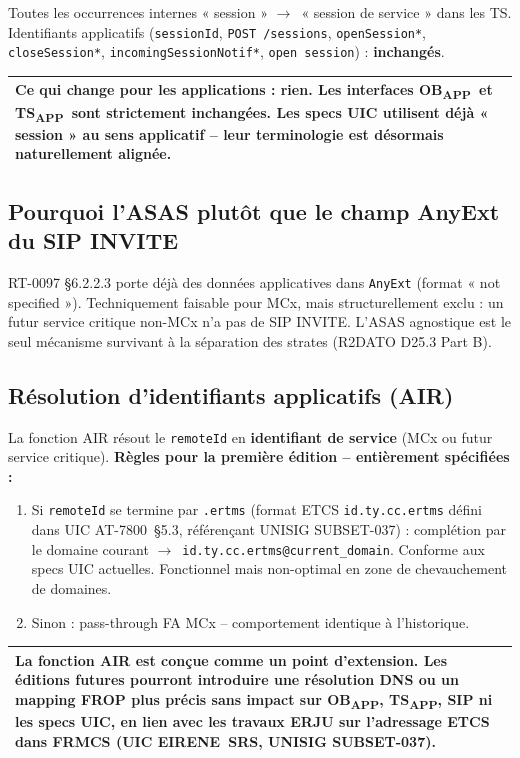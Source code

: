 \documentclass[11pt,a4paper]{article}
\newenvironment{notebox}{%
  \begin{center}\begin{tabular}{|p{0.93\textwidth}|}\hline\rowcolor{noteblue}
}{\\\hline\end{tabular}\end{center}}
\newcommand{\OBAPP}{OB\textsubscript{APP}}
\newcommand{\TSAPP}{TS\textsubscript{APP}}
\newcommand{\arr}{$\to$}
\begin{document}
Toutes les occurrences internes « session » \arr\ « session de service » dans les TS.
Identifiants applicatifs (\texttt{sessionId}, \texttt{POST /sessions},
\texttt{openSession*}, \texttt{closeSession*}, \texttt{incomingSessionNotif*},
\texttt{open session}) : \textbf{inchangés}.

\begin{notebox}
  \textbf{Ce qui change pour les applications : rien.} Les interfaces \OBAPP\ et
  \TSAPP\ sont strictement inchangées. Les specs UIC utilisent déjà « session » au
  sens applicatif -- leur terminologie est désormais naturellement alignée.
\end{notebox}

\subsection{Pourquoi l'ASAS plutôt que le champ AnyExt du SIP INVITE}

RT-0097 §6.2.2.3 porte déjà des données applicatives dans \texttt{AnyExt} (format
« not specified »). Techniquement faisable pour MCx, mais structurellement exclu :
un futur service critique non-MCx n'a pas de SIP INVITE. L'ASAS agnostique est le
seul mécanisme survivant à la séparation des strates (R2DATO D25.3 Part B).

\subsection{Résolution d'identifiants applicatifs (AIR)}

La fonction AIR résout le \texttt{remoteId} en \textbf{identifiant de service}
(MCx ou futur service critique).
\textbf{Règles pour la première édition -- entièrement spécifiées :}

\begin{enumerate}[leftmargin=2em]
  \item Si \texttt{remoteId} se termine par \texttt{.ertms} (format ETCS
    \texttt{id.ty.cc.ertms} défini dans UIC AT-7800~§5.3, référençant
    UNISIG SUBSET-037) : complétion par le domaine courant
    \arr\ \texttt{id.ty.cc.ertms@current\_domain}.
    Conforme aux specs UIC actuelles. Fonctionnel mais non-optimal en zone de
    chevauchement de domaines.
  \item Sinon : pass-through FA MCx -- comportement identique à l'historique.
\end{enumerate}

\begin{notebox}
  La fonction AIR est conçue comme un \textbf{point d'extension}. Les éditions
  futures pourront introduire une résolution DNS ou un mapping FROP plus précis
  sans impact sur \OBAPP, \TSAPP, SIP ni les specs UIC, en lien avec les travaux
  ERJU sur l'adressage ETCS dans FRMCS (UIC EIRENE~SRS, UNISIG SUBSET-037).
\end{notebox}
\end{document}
